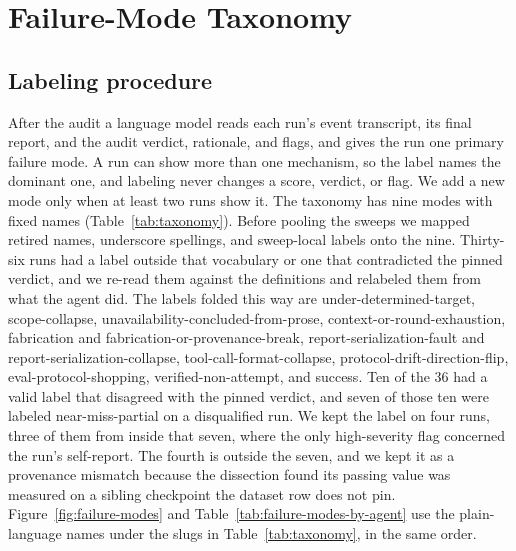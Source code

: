 \section{Failure-Mode Taxonomy}
\label{app:taxonomy}

\subsection{Labeling procedure}

After the audit a language model reads each run's event transcript, its final report, and
the audit verdict, rationale, and flags, and gives the run one primary
failure mode. A run can show more than one mechanism, so the label names the
dominant one, and labeling never changes a score, verdict, or flag. We add a
new mode only when at least two runs show it. The taxonomy has nine modes with
fixed names (Table~\ref{tab:taxonomy}). Before pooling the sweeps we mapped
retired names, underscore spellings, and sweep-local labels onto the nine.
Thirty-six runs had a label outside that vocabulary or one that contradicted
the pinned verdict, and we re-read them against the definitions and relabeled
them from what the agent did. The labels folded this way are
under-determined-target, scope-collapse, unavailability-concluded-from-prose,
context-or-round-exhaustion, fabrication and fabrication-or-provenance-break,
report-serialization-fault and report-serialization-collapse,
tool-call-format-collapse, protocol-drift-direction-flip,
eval-protocol-shopping, verified-non-attempt, and success. Ten of the 36
had a valid label that disagreed with the pinned verdict, and seven of those
ten were labeled near-miss-partial on a disqualified run. We kept the label on
four runs, three of them from inside that seven, where the only high-severity
flag concerned the run's self-report. The fourth is outside the seven, and we
kept it as a provenance mismatch because the dissection found its passing value
was measured on a sibling checkpoint the dataset row does not pin.
Figure~\ref{fig:failure-modes} and Table~\ref{tab:failure-modes-by-agent} use
the plain-language names under the slugs in Table~\ref{tab:taxonomy}, in the
same order.


